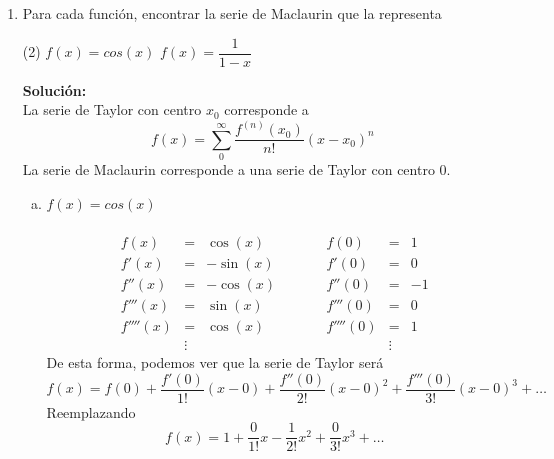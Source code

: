 \documentclass[12pt]{article}
\newenvironment{solucion}
{\begin{mdframed}[backgroundcolor=black!10]
		{\bf Solución:}\\
	}
	{
	\end{mdframed}
}
\newenvironment{preguntas}
{\begin{enumerate}\itemsep12pt
	}
	{
	\end{enumerate}
}
\begin{document}
\begin{preguntas}
\begin{solucion}
Integramos,
$$\int f(x)dx 
= \sum\limits_{n=2}^{\infty}\dfrac{\cancel{n}(n+1)}{3^{n-1}} \dfrac{x^n}{\cancel{n}} 
= \sum\limits_{n=2}^{\infty}\dfrac{n+1}{3^{n-1}} x^n$$
Integramos  nuevamente,
$$\iint f(x)dxdx 
= \sum\limits_{n=2}^{\infty}\dfrac{\cancel{n+1}}{3^{n-1}} \dfrac{x^{n+1}}{\cancel{n+1}} 
= \sum\limits_{n=2}^{\infty}\dfrac{x^{n+1}}{3^{n-1}}$$
Notemos que
$$\sum\limits_{n=2}^{\infty}\dfrac{x^{n+1}}{3^{n-1}}
= \sum\limits_{n=0}^{\infty}\dfrac{x^{n+3}}{3^{n+1}}
= \dfrac{x^3}{3}\sum\limits_{n=0}^{\infty}\left(\dfrac{x}{3}\right)^n
= \dfrac{x^3}{3}\dfrac{1}{1-\dfrac{x}{3}}
= \dfrac{x^3}{3-x}$$
Por lo que
$$\iint f(x)dxdx 
= \dfrac{x^3}{3-x}$$
Derivamos,
$$\int f(x)dx
= \left(\dfrac{x^3}{3-x}\right)' 
= \dfrac{9x^2-2x^3}{(3-x)^2}
$$
Derivamos nuevamente,
$$f(x)
= \left(\dfrac{9x^2-2x^3}{(3-x)^2}\right)' 
= \dfrac{(18x-6x^2)(3-x)^2 + 2(3-x)(9x^2-2x^3)}{(3-x)^4}
$$
Finalmente,
$$f(1)
= \dfrac{(18-6)(3-1)^2 + 2(3-1)(9-2)}{(3-1)^4}
=\dfrac{19}{4}
$$
Por lo que
$$ \sum\limits_{n=2}^{\infty}\dfrac{n(n+1)}{3^{n-1}} 
=\dfrac{19}{4}$$
\end{solucion}
\item Para cada función, encontrar la serie de Maclaurin que la representa
\begin{tasks}(2)
\task $f(x) = cos(x)$
\task $f(x) = \dfrac{1}{1-x}$
\end{tasks}
\begin{solucion}
La serie de Taylor con centro $x_0$ corresponde a
$$f(x) = \sum_0^{\infty} \dfrac{f^{(n)}(x_0)}{n!}(x-x_0)^n$$
La serie de Maclaurin corresponde a una serie de Taylor con centro 0.
\begin{enumerate}[a)]
\item $f(x) = cos(x)$\\
\\
$$
\begin{array}{rcrcrcr}
f(x) & = &\cos(x)&\qquad & f(0) & = &1\\
f'(x) & =& -\sin(x) &\qquad & f'(0) & = &0\\
f''(x) & =& -\cos(x) &\qquad & f''(0) & = &-1\\
f'''(x) & =& \sin(x) &\qquad & f'''(0) & = &0\\
f''''(x) & =& \cos(x) &\qquad & f''''(0) & =& 1\\
&\vdots&&&&\vdots
\end{array}
$$
De esta forma, podemos ver que la serie de Taylor será
$$f(x) = f(0) + \dfrac{f'(0)}{1!}(x-0) + \dfrac{f''(0)}{2!}(x-0)^2 + \dfrac{f'''(0)}{3!}(x-0)^3 + \dots$$
Reemplazando
$$f(x) = 1 + \dfrac{0}{1!}x - \dfrac{1}{2!}x^2 + \dfrac{0}{3!}x^3 +\dots$$

\end{enumerate}
\end{solucion}
\end{preguntas}
\end{document}
